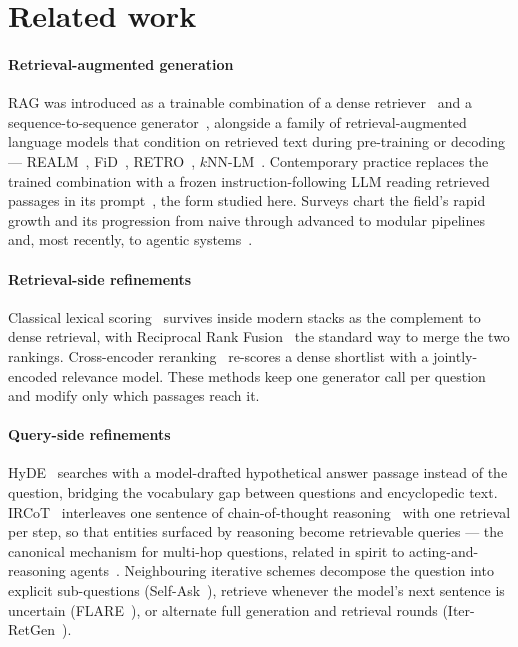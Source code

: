 \section{Related work}
\label{sec:related}

\paragraph{Retrieval-augmented generation}
RAG was introduced as a trainable combination of a dense
retriever~\citep{karpukhin2020dpr} and a sequence-to-sequence
generator~\citep{lewis2020rag}, alongside a family of retrieval-augmented
language models that condition on retrieved text during pre-training or
decoding --- REALM~\citep{guu2020realm}, FiD~\citep{izacard2021fid},
RETRO~\citep{borgeaud2022retro}, $k$NN-LM~\citep{khandelwal2020knnlm}.
Contemporary practice replaces the trained combination with a frozen
instruction-following LLM reading retrieved passages in its
prompt~\citep{ram2023incontext,shi2024replug}, the form studied here. Surveys chart the field's rapid growth
and its progression from naive through advanced to modular
pipelines~\citep{gao2023ragsurvey} and, most recently, to agentic
systems~\citep{singh2025agenticrag}.

\paragraph{Retrieval-side refinements}
Classical lexical scoring~\citep{robertson2009bm25} survives inside modern
stacks as the complement to dense retrieval, with Reciprocal Rank
Fusion~\citep{cormack2009rrf} the standard way to merge the two rankings.
Cross-encoder reranking~\citep{nogueira2019passage} re-scores a dense
shortlist with a jointly-encoded relevance model. These methods keep one
generator call per question and modify only which passages reach it.

\paragraph{Query-side refinements}
HyDE~\citep{gao2022hyde} searches with a model-drafted hypothetical answer
passage instead of the question, bridging the vocabulary gap between
questions and encyclopedic text. IRCoT~\citep{trivedi2023ircot} interleaves
one sentence of chain-of-thought reasoning~\citep{wei2022cot} with one
retrieval per step, so that entities surfaced by reasoning become
retrievable queries --- the canonical mechanism for multi-hop questions,
related in spirit to acting-and-reasoning agents~\citep{yao2023react}.
Neighbouring iterative schemes decompose the question into explicit
sub-questions (Self-Ask~\citep{press2023selfask}), retrieve whenever the
model's next sentence is uncertain (FLARE~\citep{jiang2023flare}), or
alternate full generation and retrieval rounds
(Iter-RetGen~\citep{shao2023iterretgen}).

